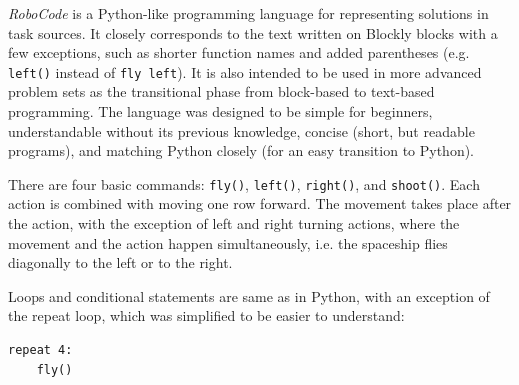 \emph{RoboCode} is a Python-like programming language
for representing solutions in task sources.
It closely corresponds to the text written on Blockly blocks
with a few exceptions, such as %
shorter function names and added parentheses
(e.g. \texttt{left()} instead of \texttt{fly left}).
It is also intended to be used in more advanced problem sets as the
transitional phase from block-based to text-based programming.
The language was designed %
to be simple for beginners, understandable without its previous knowledge,
concise (short, but readable programs),
and matching Python closely (for an easy transition to Python).



There are four basic commands: %
\texttt{fly()},
\texttt{left()},
\texttt{right()}, and
\texttt{shoot()}.
Each action is combined with moving one row forward.
The movement takes place after the action, with the exception of left and right turning actions, where the movement and the action happen simultaneously,
i.e. the spaceship flies diagonally to the left or to the right.

Loops and conditional statements are same as in Python,
with an exception of the repeat loop,
which was simplified %
to be easier to understand: %
\begin{lstlisting}
repeat 4:
    fly()
\end{lstlisting}

